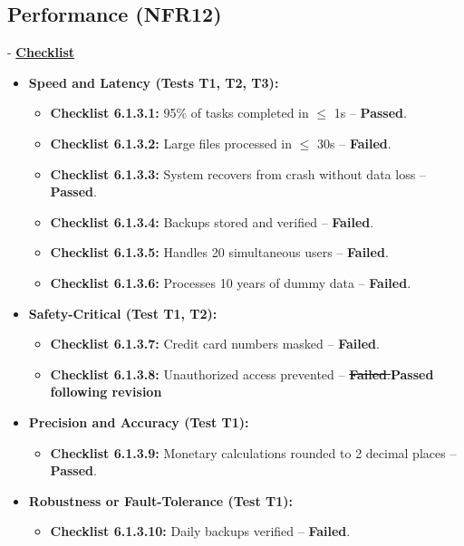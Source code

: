 \documentclass[12pt, titlepage]{article}
\begin{document}
\subsection{Performance (NFR12)}
- \textbf{\hyperlink{checklist-nfr12}{Checklist}}
\label{nfr12}

\begin{itemize}
    \item \textbf{Speed and Latency (Tests T1, T2, T3):}  
    \begin{itemize}
        \item \textbf{Checklist 6.1.3.1:} 95\% of tasks completed in $\le$ 1s – \textbf{Passed}.  
        \item \textbf{Checklist 6.1.3.2:} Large files processed in $\le$ 30s – \textbf{Failed}.  
        \item \textbf{Checklist 6.1.3.3:} System recovers from crash without data loss – \textbf{Passed}.  
        \item \textbf{Checklist 6.1.3.4:} Backups stored and verified – \textbf{Failed}.  
        \item \textbf{Checklist 6.1.3.5:} Handles 20 simultaneous users – \textbf{Failed}.  
        \item \textbf{Checklist 6.1.3.6:} Processes 10 years of dummy data – \textbf{Failed}.  
    \end{itemize}
    
    \item \textbf{Safety-Critical (Test T1, T2):}  
    \begin{itemize}
        \item \textbf{Checklist 6.1.3.7:} Credit card numbers masked – \textbf{Failed}.  
        \item \textbf{Checklist 6.1.3.8:} Unauthorized access prevented – \st{\textbf{Failed}.}\textbf{Passed following revision}
    \end{itemize}
    
    \item \textbf{Precision and Accuracy (Test T1):}  
    \begin{itemize}
        \item \textbf{Checklist 6.1.3.9:} Monetary calculations rounded to 2 decimal places – \textbf{Passed}.  
    \end{itemize}
    
    \item \textbf{Robustness or Fault-Tolerance (Test T1):}  
    \begin{itemize}
        \item \textbf{Checklist 6.1.3.10:} Daily backups verified – \textbf{Failed}.  
    \end{itemize}
    

\end{itemize}
\end{document}
